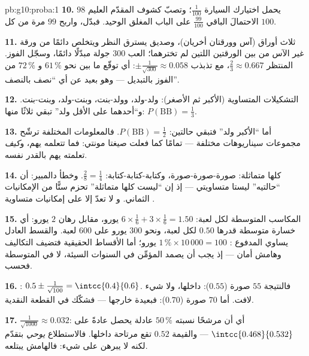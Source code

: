 \begin{solution}{pb:g10:proba:1}
\textbf{10.} يحمل اختيارك السيارة 
$\frac{1}{100}$؛ وتصبّ كشوف المقدّم العليم $98$
الاحتمالَ الباقي $\frac{99}{100}$ على الباب المغلق الوحيد. فبدّل،
واربح $99$ مرة من كل $100$.

\textbf{11.} ثلاث أوراق (آس وورقتان أخريان)، وصديق
يسترق النظر ويتخلص دائمًا من ورقة غير الآس من بين الورقتين اللتين لم
تخترهما؛ العب $300$ جولة مبدّلًا دائمًا، وسجّل الفوز.
 المنتظر $\frac23 \approx 0.667$، مع تذبذب
$\pm\frac{1}{\sqrt{300}} \approx 0.058$: أي توقّع ما بين نحو
$61\,\%$ و $72\,\%$ من الفوز بالتبديل --- وهو بعيد عن أي
``نصف بالنصف''.

\textbf{12.} التشكيلات المتساوية  (الأكبر ثم الأصغر):
ولد-ولد، وولد-بنت، وبنت-ولد، وبنت-بنت. و``أحدهما على الأقل ولد'' تبقي ثلاثًا منها:
$P(\text{BB}) = \frac13$.

\textbf{13.} أما ``الأكبر ولد'' فتبقي حالتين:
$P(\text{BB}) = \frac12$. فالمعلومات المختلفة ترشّح
مجموعات سيناريوهات مختلفة --- تمامًا كما فعلت صيغتا مونتي: فما
تتعلمه يهم، و\emph{كيف} تعلمته يهم بالقدر
نفسه.

\textbf{14.} كلها متماثلة: صورة-صورة-صورة، وكتابة-كتابة-كتابة: $\frac28 = \frac14$.
وخطأ دالمبير: أن ``حالتيه'' ليستا متساويتي 
--- إذ إن ``ليست كلها متماثلة'' تحزم ستًّا من الإمكانيات الثماني.
و  لا تعدّ إلا على إمكانيات متساوية
.

\textbf{15.} المكاسب المتوسطة لكل لعبة: $6 \times \frac16 + 3
\times \frac16 = 1.50$ يورو، مقابل رهان $2$ يورو: أي
خسارة متوسطة قدرها $0.50$ لكل لعبة، ونحو $300$ يورو على  $600$
لعبة. والقسط العادل يساوي المدفوع :
$1\,\% \times 10\,000 = 100$ يورو؛ أما الأقساط الحقيقية فتضيف التكاليف
وهامش أمان --- إذ يجب أن يصمد المؤمِّن في السنوات السيئة،
لا في المتوسطة فحسب.

\textbf{16.} : $0.5 \pm \frac{1}{\sqrt{100}} =
\intcc{0.4}{0.6}$. فالنتيجة $55$ صورة ($0.55$): داخلها، ولا شيء لافت.
أما $70$ صورة ($0.70$): فبعيدة خارجها --- فشكّك في القطعة النقدية.

\textbf{17.} $\frac{1}{\sqrt{1000}} \approx 0.032$: أي أن مرشحًا نسبته
$50\,\%$ عادلة يحصل عادةً على
$\intcc{0.468}{0.532}$ --- والقيمة $0.52$ تقع مرتاحة داخلها.
فالاستطلاع \emph{يوحي} بتقدّم لكنه لا يبرهن على شيء: فالهامش
يبتلعه.


\end{solution}
